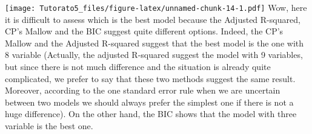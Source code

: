 \documentclass[
]{article}
\begin{document}
\texttt{[image: Tutorato5\_files/figure-latex/unnamed-chunk-14-1.pdf]}
Wow, here it is difficult to assess which is the best model because the
Adjusted R-squared, CP's Mallow and the BIC suggest quite different
options. Indeed, the CP's Mallow and the Adjusted R-squared suggest that
the best model is the one with 8 variable (Actually, the adjusted
R-squared suggest the model with 9 variables, but since there is not
much difference and the situation is already quite complicated, we
prefer to say that these two methods suggest the same result. Moreover,
according to the one standard error rule when we are uncertain between
two models we should always prefer the simplest one if there is not a
huge difference). On the other hand, the BIC shows that the model with
three variable is the best one.
\end{document}
